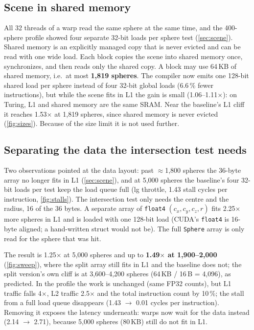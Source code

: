 \documentclass[11pt,a4paper]{article}
\begin{document}
\subsection{Scene in shared memory}
\label{sec:shared}

All 32 threads of a warp read the same sphere at the same time, and the 400-sphere profile showed four
separate 32-bit loads per sphere test (\cref{sec:scene}). Shared memory is an explicitly managed copy
that is never evicted and can be read with one wide load. Each block copies the scene into shared memory once, synchronizes, and then reads only the shared
copy. A block may use 64\,KB of shared memory, i.e.\ at most \textbf{1,819 spheres}. The compiler now
emits one 128-bit shared load per sphere instead of four 32-bit global loads (6.6\,\% fewer
instructions), but while the scene fits in L1 the gain is small (1.06--1.11$\times$): on Turing, L1
and shared memory are the same SRAM. Near the baseline's L1 cliff it reaches 1.53$\times$ at 1,819
spheres, since shared memory is never evicted (\cref{fig:sizes}). Because of the size limit it is not
used further.

\subsection{Separating the data the intersection test needs}
\label{sec:split}

Two observations pointed at the data layout: past $\approx$1,800 spheres the 36-byte array no longer
fits in L1 (\cref{sec:scene}), and at 5,000 spheres the baseline's four 32-bit loads per test keep
the load queue full (lg throttle, 1.43 stall cycles per instruction, \cref{fig:stalls}). The
intersection test only needs the centre and the radius, 16 of the 36 bytes. A separate array of
\texttt{float4} $(c_x, c_y, c_z, r)$ fits 2.25$\times$ more spheres in L1 and is loaded with one
128-bit load (CUDA's \texttt{float4} is 16-byte aligned; a hand-written struct would not be). The
full \texttt{Sphere} array is only read for the sphere that was hit.

The result is 1.25$\times$ at 5,000 spheres and up to \textbf{1.49$\times$ at 1,900--2,000}
(\cref{fig:sweep}), where the split array still fits in L1 and the baseline does not; the split
version's own cliff is at 3,600--4,200 spheres (64\,KB / 16\,B = 4,096), as predicted. In the profile the work is
unchanged (same FP32 counts), but L1 traffic falls 4$\times$, L2 traffic 2.5$\times$ and the total
instruction count by 10\,\%; the stall from a full load queue disappears (1.43 $\to$ 0.01 cycles per
instruction). Removing it exposes the latency underneath: warps now wait for the data instead
(2.14 $\to$ 2.71), because 5,000 spheres (80\,KB) still do not fit in L1.
\end{document}
